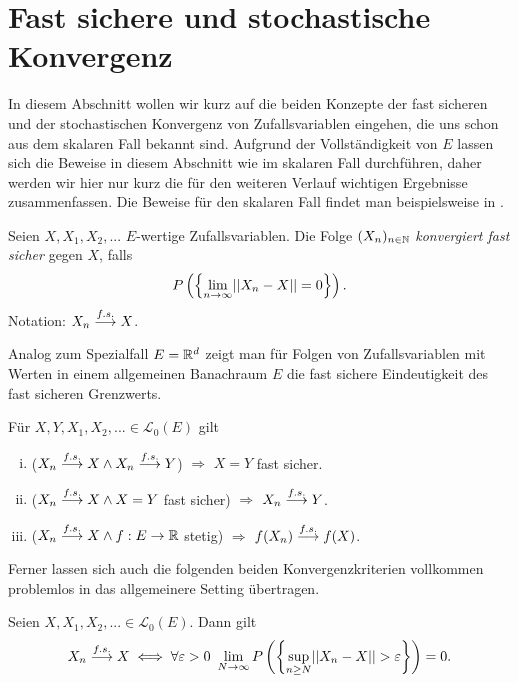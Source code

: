 \section{Fast sichere und stochastische Konvergenz}
In diesem Abschnitt wollen wir kurz auf die beiden Konzepte der fast sicheren und der stochastischen Konvergenz von Zufallsvariablen eingehen, die uns schon aus dem skalaren Fall bekannt sind. 
Aufgrund der Vollständigkeit von $E$ lassen sich die Beweise in diesem Abschnitt wie im skalaren Fall durchführen, daher werden wir hier nur kurz die für den weiteren Verlauf wichtigen Ergebnisse zusammenfassen.  
Die Beweise für den skalaren Fall findet man beispielsweise in \cite{gs}. 
\begin{mydef}
    Seien $X, X_1, X_2,...$ $E$-wertige Zufallsvariablen. Die Folge $(X_n)_{n \in \mathbb{N}}$ \textit{konvergiert fast sicher} gegen $X$, falls
    $$
        P\left(\left\{ \lim_{n \to \infty} \lvert\lvert X_n - X \rvert\rvert = 0 \right\}\right).
    $$
Notation: $X_n \overset{f.s.}{\longrightarrow} X$. 
\end{mydef}

Analog zum Spezialfall $E = \mathbb{R}^d$ zeigt man für Folgen von Zufallsvariablen mit Werten in einem allgemeinen Banachraum $E$ die fast sichere Eindeutigkeit des fast sicheren Grenzwerts. 
\begin{proposition}
    Für $X,Y,X_1,X_2,... \in \mathcal{L}_0(E)$ gilt 
    \begin{enumerate}[(i)]
        \item ($X_n \overset{f.s.}{\longrightarrow} X \land X_n \overset{f.s.}{\longrightarrow} Y$) $\Rightarrow$ $ X = Y$ fast sicher. 
        \item ($X_n \overset{f.s.}{\longrightarrow} X \land X = Y$ fast sicher) $\Rightarrow$ $X_n \overset{f.s.}{\longrightarrow} Y$. 
        \item ($X_n \overset{f.s.}{\longrightarrow} X \land f:E \to \mathbb{R}$ stetig) $\Rightarrow$ $f(X_n) \overset{f.s.}{\longrightarrow} f(X)$. 
    \end{enumerate}
\end{proposition}

Ferner lassen sich auch die folgenden beiden Konvergenzkriterien vollkommen problemlos in das allgemeinere Setting übertragen. 

\begin{theorem}
    Seien $X, X_1,X_2,... \in \mathcal{L}_0(E)$. Dann gilt
    \begin{align*}
        X_n \overset{f.s.}{\longrightarrow} X \iff \forall \varepsilon > 0 \ \lim_{N \to \infty}P\left(\left\{ \sup_{n \geq N}\lvert\lvert X_n - X \rvert\rvert > \varepsilon \right\}\right) = 0.
    \end{align*}
\end{theorem}

